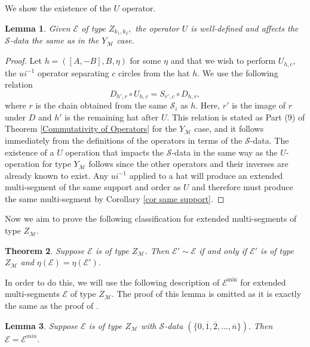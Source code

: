 \documentclass[11pt,letterpaper]{amsart}
\newcommand{\EE}{\mathcal{E}}
\newtheorem{thm}{Theorem}[section]
\newtheorem{lemma}[thm]{Lemma}
\numberwithin{equation}{section}
\begin{document}
We show the existence of the $U$ operator.

\begin{lemma}
\label{U exstence Z}
    Given $\mathcal{E}$ of type $Z_{k_1, k_2},$ the operator $U$ is well-defined and affects the $\mathcal{S}$-data the same as in the $Y_\mathcal{M}$ case.
\end{lemma}

\begin{proof}
    Let $h = ([A, -B], B, \eta)$ for some $\eta$ and that we wish to perform $U_{h, c},$ the $ui^{-1}$ operator separating $c$ circles from the hat $h$. We use the following relation
    $$D_{h', r} \circ U_{h, c} =  S_{r', c}  \circ D_{h, r},$$
    where $r$ is the chain obtained from the same $\mathcal{S}_i$ as $h.$ Here, $r'$ is the image of $r$ under $D$ and $h'$ is the remaining hat after $U.$ This relation is stated as Part (9) of Theorem \ref{Commutativity of Operators} for the $Y_\mathcal{M}$ case, and it follows immediately from the definitions of the operators in terms of the $\mathcal{S}$-data. The existence of a $U$ operation that impacts the $\mathcal{S}$-data in the same way as the $U$-operation for type $Y_\mathcal{M}$ follows since the other operators and their inverses are already known to exist. Any $ui^{-1}$ applied to a hat will produce an extended multi-segment of the same support and order as $U$ and therefore must produce the same multi-segment by Corollary \ref{cor same support}.
\end{proof}

Now we aim to prove the following classification for extended multi-segments of type $Z_\mathcal{M}.$

\begin{thm}
\label{Z Classification}
    Suppose $\mathcal{E}$ is of type $Z_\mathcal{M}$. Then $\mathcal{E}' \sim \mathcal{E}$ if and only if $\mathcal{E}'$ is of type $Z_\mathcal{M}$ and $\eta(\mathcal{E}) = \eta(\mathcal{E}').$
\end{thm}

In order to do this, we will use the following description of $\mathcal{E}^{\min}$ for extended multi-segments $\mathcal{E}$ of type $Z_{\mathcal{M}}.$ The proof of this lemma is omitted as it is exactly the same as the proof of \cite[Lemma 5.46]{HKT26}.

\begin{lemma}
\label{E min classification Z}
    Suppose $\EE$ is of type $Z_\mathcal{M}$ with $\mathcal{S}$-data $(\{0, \overline{1}, \overline{2}, \dots, \overline{n}\}).$ Then $\EE = \EE^{min}.$
\end{lemma}
\end{document}
